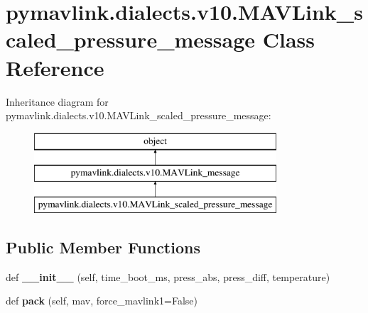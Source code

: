 \hypertarget{classpymavlink_1_1dialects_1_1v10_1_1MAVLink__scaled__pressure__message}{}\section{pymavlink.\+dialects.\+v10.\+M\+A\+V\+Link\+\_\+scaled\+\_\+pressure\+\_\+message Class Reference}
\label{classpymavlink_1_1dialects_1_1v10_1_1MAVLink__scaled__pressure__message}
Inheritance diagram for pymavlink.\+dialects.\+v10.\+M\+A\+V\+Link\+\_\+scaled\+\_\+pressure\+\_\+message\+:\begin{figure}[H]
\begin{center}
\leavevmode
\includegraphics[height=3.000000cm]{classpymavlink_1_1dialects_1_1v10_1_1MAVLink__scaled__pressure__message}
\end{center}
\end{figure}
\subsection*{Public Member Functions}
\begin{DoxyCompactItemize}
\item 
\mbox{\label{classpymavlink_1_1dialects_1_1v10_1_1MAVLink__scaled__pressure__message_a8ff7c4fa82dc17cbb67fe5903a7a9c4e}} 
def {\bfseries \+\_\+\+\_\+init\+\_\+\+\_\+} (self, time\+\_\+boot\+\_\+ms, press\+\_\+abs, press\+\_\+diff, temperature)
\item 
\mbox{\label{classpymavlink_1_1dialects_1_1v10_1_1MAVLink__scaled__pressure__message_a9d7d0ea631549e560cec7ec13cf7c67f}} 
def {\bfseries pack} (self, mav, force\+\_\+mavlink1=False)
\end{DoxyCompactItemize}
